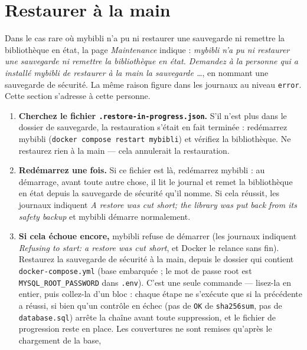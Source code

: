\section{Restaurer à la main}
\label{sec:restore-by-hand}

Dans le cas rare où mybibli n'a pu ni restaurer une sauvegarde ni
remettre la bibliothèque en état, la page \emph{Maintenance} indique :
\emph{mybibli n'a pu ni restaurer une sauvegarde ni remettre la
bibliothèque en état. Demandez à la personne qui a installé mybibli de
restaurer à la main la sauvegarde \dots}, en nommant une sauvegarde de
sécurité. La même raison figure dans les journaux au niveau
\texttt{error}. Cette section s'adresse à cette personne.

\begin{enumerate}
  \item \textbf{Cherchez le fichier
        \texttt{.restore-\allowbreak in-\allowbreak progress.json}.} S'il
        n'est plus dans le dossier de sauvegarde, la restauration
        s'était en fait terminée : redémarrez mybibli
        (\texttt{docker compose restart mybibli}) et vérifiez la
        bibliothèque. Ne restaurez rien à la main --- cela annulerait la
        restauration.
  \item \textbf{Redémarrez une fois.} Si ce fichier est là, redémarrez
        mybibli : au démarrage, avant toute autre chose, il lit le
        journal et remet la bibliothèque en état depuis la sauvegarde de
        sécurité qu'il nomme. Si cela réussit, les journaux indiquent
        \emph{A restore was cut short; the library was put back from its
        safety backup} et mybibli démarre normalement.
  \item \textbf{Si cela échoue encore,} mybibli refuse de démarrer (les
        journaux indiquent \emph{Refusing to start: a restore was cut
        short}, et Docker le relance sans fin). Restaurez la sauvegarde
        de sécurité à la main, depuis le dossier qui contient
        \texttt{docker-compose.yml} (base embarquée ; le mot de passe
        root est \texttt{MYSQL\_ROOT\_PASSWORD} dans \texttt{.env}).
        C'est une seule commande --- lisez-la en entier, puis collez-la
        d'un bloc : chaque étape ne s'exécute que si la précédente a
        réussi, si bien qu'un
        contrôle en échec (pas de \texttt{OK} de \texttt{sha256sum}, pas
        de \texttt{database.sql}) arrête la chaîne avant toute
        suppression, et le fichier de progression reste en place. Les
        couvertures ne sont remises qu'après le chargement de la base,

\end{enumerate}
